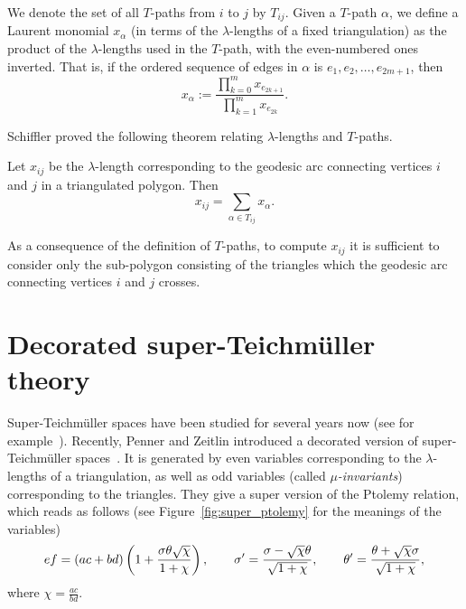 We denote the set of all $T$-paths from $i$ to $j$ by $T_{ij}$. Given a $T$-path $\alpha$,
we define a Laurent monomial $x_\alpha$ (in terms of the $\lambda$-lengths of a fixed triangulation) as
the product of the $\lambda$-lengths used in the $T$-path, with the even-numbered ones inverted. That is,
if the ordered sequence of edges in $\alpha$ is $e_1, e_2, \dots, e_{2m+1}$, then
\[ x_\alpha := \frac{\prod_{k=0}^m x_{e_{2k+1}}}{\prod_{k=1}^m x_{e_{2k}}}. \]

Schiffler proved the following theorem relating $\lambda$-lengths and $T$-paths.

\begin{Theorem} Let $x_{ij}$ be the $\lambda$-length corresponding to the geodesic arc
 connecting vertices $i$ and $j$ in a triangulated polygon. Then
 \[ x_{ij} = \sum_{\alpha \in T_{ij}} x_\alpha. \]
\end{Theorem}

\begin{Remark} \label{rem:subtriang}\rm
As a consequence of the definition of $T$-paths, to compute $x_{ij}$ it is sufficient to consider only the sub-polygon consisting of the
triangles which the geodesic arc connecting vertices $i$ and $j$ crosses.
\end{Remark}

\section{Decorated super-Teichm\"{u}ller theory}\label{sec:dec_super}

Super-Teichm\"{u}ller spaces have been studied for several years now (see for example~\cite{cr_88}).
Recently, Penner and Zeitlin introduced a decorated version of super-Teichm\"{u}ller spaces~\cite{pz_19}.
It is generated by even variables corresponding to the
$\lambda$-lengths of a triangulation, as well as odd variables (called \emph{$\mu$-invariants}) corresponding to the triangles. They give
a super version of the Ptolemy relation, which reads as follows (see Figure~\ref{fig:super_ptolemy} for the meanings of the variables)
\begin{gather*}
 ef = (ac+bd)\left( 1+{{\sigma\theta\sqrt{\chi}}\over{1+\chi}}\right),\qquad
 \sigma' = {{\sigma-\sqrt{\chi}\theta}\over{\sqrt{1+\chi}}},\qquad
 \theta' = {{\theta+\sqrt{\chi}\sigma}\over{\sqrt{1+\chi}}},
\end{gather*}
where $ \chi = \frac{ac}{bd}$.



